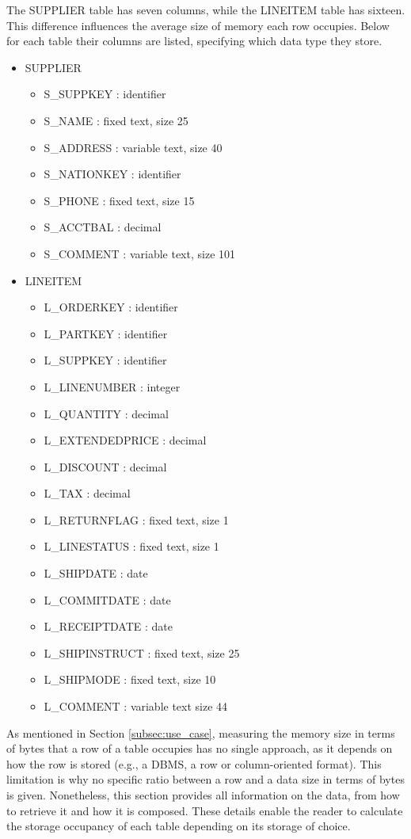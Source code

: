The SUPPLIER table has seven columns, while the LINEITEM table has sixteen. This difference influences the average size of memory each row occupies. Below for each table their columns are listed, specifying which data type they store.
\begin{itemize}
  \item SUPPLIER
  \begin{itemize}
    \item S\_SUPPKEY : identifier
    \item S\_NAME : fixed text, size 25
    \item S\_ADDRESS : variable text, size 40
    \item S\_NATIONKEY : identifier
    \item S\_PHONE : fixed text, size 15
    \item S\_ACCTBAL : decimal
    \item S\_COMMENT : variable text, size 101
  \end{itemize}
  \item LINEITEM
  \begin{itemize}
    \item L\_ORDERKEY : identifier
    \item L\_PARTKEY : identifier
    \item L\_SUPPKEY : identifier
    \item L\_LINENUMBER : integer
    \item L\_QUANTITY : decimal
    \item L\_EXTENDEDPRICE : decimal
    \item L\_DISCOUNT : decimal
    \item L\_TAX : decimal
    \item L\_RETURNFLAG : fixed text, size 1
    \item L\_LINESTATUS : fixed text, size 1
    \item L\_SHIPDATE : date
    \item L\_COMMITDATE : date
    \item L\_RECEIPTDATE : date
    \item L\_SHIPINSTRUCT : fixed text, size 25
    \item L\_SHIPMODE : fixed text, size 10
    \item L\_COMMENT : variable text size 44
  \end{itemize} 
\end{itemize}
As mentioned in Section \ref{subsec:use_case}, measuring the memory size in terms of bytes that a row of a table occupies has no single approach, as it depends on how the row is stored (e.g., a \gls{DBMS}, a row or column-oriented format). This limitation is why no specific ratio between a row and a data size in terms of bytes is given. Nonetheless, this section provides all information on the data, from how to retrieve it and how it is composed. These details enable the reader to calculate the storage occupancy of each table depending on its storage of choice.

